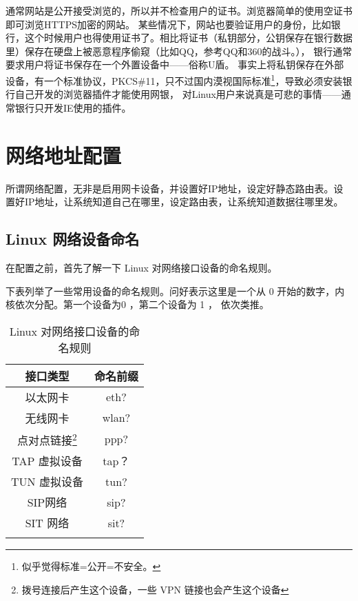 通常网站是公开接受浏览的，所以并不检查用户的证书。浏览器简单的使用空证书即可浏览HTTPS加密的网站。
某些情况下，网站也要验证用户的身份，比如银行，这个时候用户也得使用证书了。相比将证书（私钥部分，公钥保存在银行数据里）保存在硬盘上被恶意程序偷窥（比如QQ，参考QQ和360的战斗。），
银行通常要求用户将证书保存在一个外置设备中——俗称U盾。
事实上将私钥保存在外部设备，有一个标准协议，PKCS\#11，只不过国内漠视国际标准\footnote{似乎觉得标准=公开=不安全。}，导致必须安装银行自己开发的浏览器插件才能使用网银，
对Linux用户来说真是可悲的事情——通常银行只开发IE使用的插件。


\section{网络地址配置}\label{sec:ifconfig}

所谓网络配置，无非是启用网卡设备，并设置好IP地址，设定好静态路由表。设置好IP地址，让系统知道自己在哪里，设定路由表，让系统知道数据往哪里发。

\subsection{Linux 网络设备命名}

在配置之前，首先了解一下 Linux 对网络接口设备的命名规则。

下表列举了一些常用设备的命名规则。问好表示这里是一个从 0 开始的数字，内核依次分配。第一个设备为0 ，第二个设备为 1 ， 依次类推。

\begin{longtable}{|c|c|}

\hline

接口类型 & 命名前缀 \\
\hline

以太网卡 & eth? \\

\hline

无线网卡 &  wlan? \\

\hline

点对点链接\footnote{拨号连接后产生这个设备，一些 VPN 链接也会产生这个设备} & ppp?  \\

\hline

TAP 虚拟设备 & tap？ \\

\hline

TUN 虚拟设备 &  tun? \\

\hline

SIP网络 & sip? \\

\hline

SIT 网络 & sit? \\ \hline

\caption{Linux 对网络接口设备的命名规则} \\

\end{longtable}

